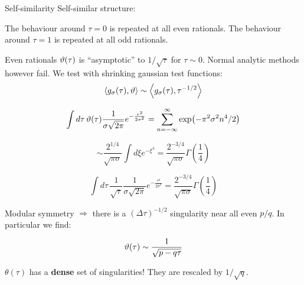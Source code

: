 \documentclass{beamer}
\begin{document}
\begin{frame}{Self-similarity}
    Self-similar structure:

    \begin{center}
        \Large The behaviour around $\tau = 0$ is repeated at all even rationals. The behaviour around $\tau=1$ is repeated at all odd rationals.
    \end{center}
\end{frame}

\begin{frame}{Even rationals}
        $\vartheta(\tau)$ is ``asymptotic'' to $1/\sqrt{\tau}$ for $\tau \sim 0$. Normal analytic methods however fail. We test with shrinking gaussian test functions:
\begin{equation}
    \left\langle g_\sigma(\tau), \vartheta \right\rangle \sim \left\langle g_\sigma(\tau) , \tau^{-1/2} \right\rangle
    \label{}
\end{equation}

\vfill

        \[\int d\tau \, \vartheta(\tau) \frac{1}{\sigma\sqrt{2\pi}} e^{-\frac{\tau^2}{2\sigma^2}} = \sum_{n=-\infty}^\infty \exp(-\pi^2 \sigma^2 n^4 / 2) \]
    
        \[\sim \frac{2^{1/4}}{\sqrt{\pi \sigma}} \int d\xi e^{-\xi^4} = \frac{2^{-3/4}}{\sqrt{\pi\sigma}} \Gamma(\frac{1}{4}) \]


        \[ \int d\tau \, \frac{1}{\sqrt \tau} \frac{1}{\sigma \sqrt{2\pi}} e^{-\frac{\tau^2}{2\sigma^2}}  = \frac{2^{-3/4}}{\sqrt{\pi \sigma}} \Gamma(\frac{1}{4}) \]


\end{frame}

\begin{frame}



\vfill

Modular symmetry $\Rightarrow$ there is a $(\Delta \tau)^{-1/2}$ singularity near all even $p/q$. In particular we find:

\begin{equation}
    \vartheta(\tau) \sim \frac{1}{\sqrt{p - q\tau}}
    \label{}
\end{equation}

$\theta(\tau)$ has a \textbf{dense} set of singularities! They are rescaled by $1/\sqrt{q}$.



\end{frame}
\end{document}
